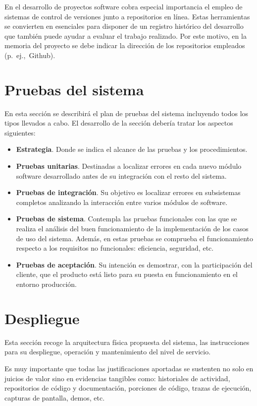 En el desarrollo de proyectos software cobra especial importancia el empleo de sistemas de control de versiones junto a repositorios en línea. Estas herramientas se convierten en esenciales para disponer de un registro histórico del desarrollo que también puede ayudar a evaluar el trabajo realizado. Por este motivo, en la memoria del proyecto se debe indicar la dirección de los repositorios empleados (p.~ej.,~Github).

\section{Pruebas del sistema}
En esta sección se describirá el plan de pruebas del sistema incluyendo todos los tipos llevados a cabo. El desarrollo de la sección debería tratar los aspectos siguientes:
\begin{itemize}[noitemsep]
\item \textbf{Estrategia}. Donde se indica el alcance de las pruebas y los procedimientos.

\item \textbf{Pruebas unitarias}. Destinadas a localizar errores en cada nuevo módulo software desarrollado antes de su integración con el resto del sistema.

\item \textbf{Pruebas de integración}. Su objetivo es localizar errores en subsistemas completos analizando la interacción entre varios módulos de software.

\item \textbf{Pruebas de sistema}. Contempla las pruebas funcionales con las que se realiza el análisis del buen funcionamiento de la implementación de los casos de uso del sistema. Además, en estas pruebas se comprueba el funcionamiento respecto a los requisitos no funcionales: eficiencia, seguridad, etc.

\item \textbf{Pruebas de aceptación}. Su intención es demostrar, con la participación del cliente, que el producto está listo para su puesta en funcionamiento en el entorno producción.
\end{itemize}

\section{Despliegue}
Esta sección recoge la arquitectura física propuesta del sistema, las instrucciones para su despliegue, operación y mantenimiento del
nivel de servicio.

Es muy importante que todas las justificaciones aportadas se sustenten no solo en juicios de valor sino en evidencias tangibles como: historiales de actividad, repositorios de código y documentación, porciones de código, trazas de ejecución, capturas de pantalla, demos, etc.
